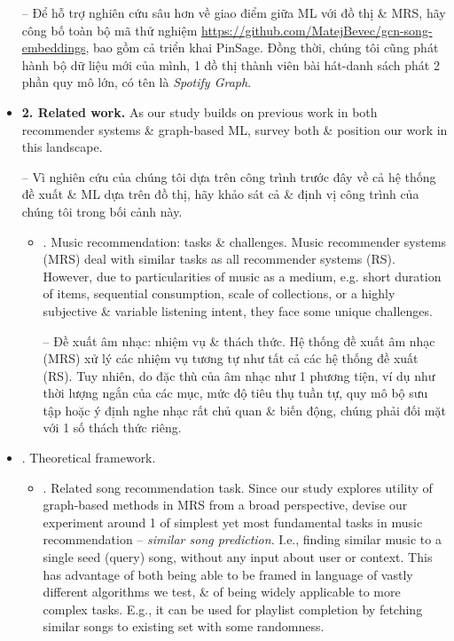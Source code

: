 \documentclass{article}
\begin{document}
\begin{itemize}
    -- Để hỗ trợ nghiên cứu sâu hơn về giao điểm giữa ML với đồ thị \& MRS, hãy công bố toàn bộ mã thử nghiệm \url{https://github.com/MatejBevec/gcn-song-embeddings}, bao gồm cả triển khai PinSage. Đồng thời, chúng tôi cũng phát hành bộ dữ liệu mới của mình, 1 đồ thị thành viên bài hát-danh sách phát 2 phần quy mô lớn, có tên là {\it Spotify Graph}.
    \item {\bf2. Related work.} As our study builds on previous work in both recommender systems \& graph-based ML, survey both \& position our work in this landscape.

    -- Vì nghiên cứu của chúng tôi dựa trên công trình trước đây về cả hệ thống đề xuất \& ML dựa trên đồ thị, hãy khảo sát cả \& định vị công trình của chúng tôi trong bối cảnh này.
    \begin{itemize}
        \item {. Music recommendation: tasks \& challenges.} Music recommender systems (MRS) deal with similar tasks as all recommender systems (RS). However, due to particularities of music as a medium, e.g. short duration of items, sequential consumption, scale of collections, or a highly subjective \& variable listening intent, they face some unique challenges.

        -- {\sf Đề xuất âm nhạc: nhiệm vụ \& thách thức.} Hệ thống đề xuất âm nhạc (MRS) xử lý các nhiệm vụ tương tự như tất cả các hệ thống đề xuất (RS). Tuy nhiên, do đặc thù của âm nhạc như 1 phương tiện, ví dụ như thời lượng ngắn của các mục, mức độ tiêu thụ tuần tự, quy mô bộ sưu tập hoặc ý định nghe nhạc rất chủ quan \& biến động, chúng phải đối mặt với 1 số thách thức riêng.
    \end{itemize}
    \item {. Theoretical framework.}
    \begin{itemize}
        \item {. Related song recommendation task.} Since our study explores utility of graph-based methods in MRS from a broad perspective, devise our experiment around 1 of simplest yet most fundamental tasks in music recommendation -- {\it similar song prediction}. I.e., finding similar music to a single seed (query) song, without any input about user or context. This has advantage of both being able to be framed in language of vastly different algorithms we test, \& of being widely applicable to more complex tasks. E.g., it can be used for playlist completion by fetching similar songs to existing set with some randomness.


\end{itemize}
\end{itemize}
\end{document}
